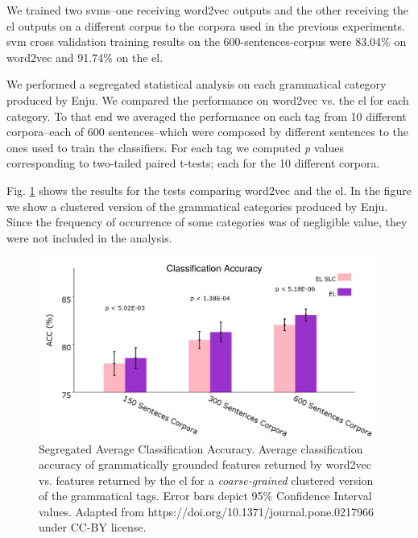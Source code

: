 {We trained two \glspl{svm}--one receiving word2vec outputs and the other receiving the \gls{el} outputs on a different corpus to the corpora used in the previous experiments.
\gls{svm} cross validation training results on the 600-sentences-corpus were 83.04\% on word2vec and 91.74\% on the \gls{el}.

We performed a segregated statistical analysis on each grammatical category produced by Enju.
We compared the performance on word2vec vs. the \gls{el} for each category. To that end we averaged the performance on each tag from 10 different corpora--each of 600 sentences--which were composed by different sentences to the ones used to train the classifiers.
For each tag we computed \emph{p} values corresponding to two-tailed paired t-tests; each for the 10 different corpora.

Fig. \ref{fig:PLOT2} shows the results for the tests comparing word2vec and the \gls{el}.
In the figure we show a clustered version of the grammatical categories produced by Enju.
Since the frequency of occurrence of some categories was of negligible value, they were not included in the analysis.



\begin{figure}[ht!]
    \centering
    \includegraphics[width=0.99\textwidth]{PLOT2.png}
    \caption{Segregated Average Classification Accuracy. Average classification accuracy of grammatically grounded features returned by word2vec vs. features returned by the \gls{el} for a \emph{coarse-grained} clustered version of the grammatical tags. Error bars depict 95\% Confidence Interval values. Adapted from https://doi.org/10.1371/journal.pone.0217966 under CC-BY license.}
    \label{fig:PLOT2}
\end{figure}

}
